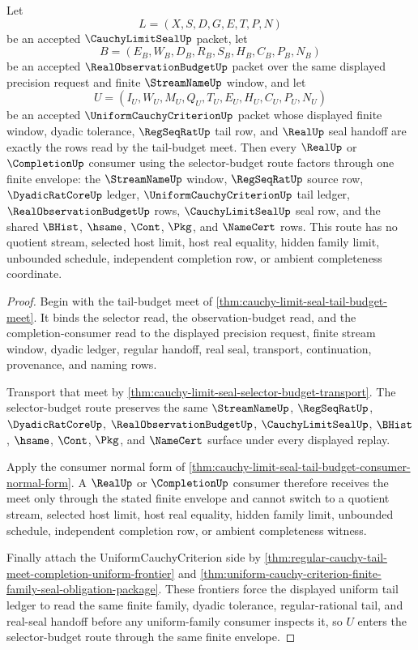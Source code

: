 \begin{theorem}
\label{thm:cauchy-limit-seal-tail-meet-uniform-selector-route}
Let
$$
L=(X,S,D,G,E,T,P,N)
$$
be an accepted $\CauchyLimitSealUp$ packet, let
$$
B=(E_B,W_B,D_B,R_B,S_B,H_B,C_B,P_B,N_B)
$$
be an accepted $\RealObservationBudgetUp$ packet over the same displayed precision request and finite $\StreamNameUp$ window, and let
$$
U=(I_U,W_U,M_U,Q_U,T_U,E_U,H_U,C_U,P_U,N_U)
$$
be an accepted $\UniformCauchyCriterionUp$ packet whose displayed finite window, dyadic tolerance, $\RegSeqRatUp$ tail row, and $\RealUp$ seal handoff are exactly the rows read by the tail-budget meet. Then every $\RealUp$ or $\CompletionUp$ consumer using the selector-budget route factors through one finite envelope: the $\StreamNameUp$ window, $\RegSeqRatUp$ source row, $\DyadicRatCoreUp$ ledger, $\UniformCauchyCriterionUp$ tail ledger, $\RealObservationBudgetUp$ rows, $\CauchyLimitSealUp$ seal row, and the shared $\BHist$, $\hsame$, $\Cont$, $\Pkg$, and $\NameCert$ rows. This route has no quotient stream, selected host limit, host real equality, hidden family limit, unbounded schedule, independent completion row, or ambient completeness coordinate.
\end{theorem}
\begin{proof}
Begin with the tail-budget meet of \autoref{thm:cauchy-limit-seal-tail-budget-meet}. It binds the selector read, the observation-budget read, and the completion-consumer read to the displayed precision request, finite stream window, dyadic ledger, regular handoff, real seal, transport, continuation, provenance, and naming rows.

Transport that meet by \autoref{thm:cauchy-limit-seal-selector-budget-transport}. The selector-budget route preserves the same $\StreamNameUp$, $\RegSeqRatUp$, $\DyadicRatCoreUp$, $\RealObservationBudgetUp$, $\CauchyLimitSealUp$, $\BHist$, $\hsame$, $\Cont$, $\Pkg$, and $\NameCert$ surface under every displayed replay.

Apply the consumer normal form of \autoref{thm:cauchy-limit-seal-tail-budget-consumer-normal-form}. A $\RealUp$ or $\CompletionUp$ consumer therefore receives the meet only through the stated finite envelope and cannot switch to a quotient stream, selected host limit, host real equality, hidden family limit, unbounded schedule, independent completion row, or ambient completeness witness.

Finally attach the UniformCauchyCriterion side by \autoref{thm:regular-cauchy-tail-meet-completion-uniform-frontier} and \autoref{thm:uniform-cauchy-criterion-finite-family-seal-obligation-package}. These frontiers force the displayed uniform tail ledger to read the same finite family, dyadic tolerance, regular-rational tail, and real-seal handoff before any uniform-family consumer inspects it, so $U$ enters the selector-budget route through the same finite envelope.
\end{proof}

